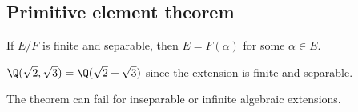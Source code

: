 \subsection{Primitive element theorem}
\begin{theorem}
If $E/F$ is finite and separable, then $E=F(\alpha)$ for some $\alpha\in E$.
\end{theorem}
\begin{example}
$\Q(\sqrt2,\sqrt3)=\Q(\sqrt2+\sqrt3)$ since the extension is finite and separable.
\end{example}
\begin{remark}
The theorem can fail for inseparable or infinite algebraic extensions.
\end{remark}
